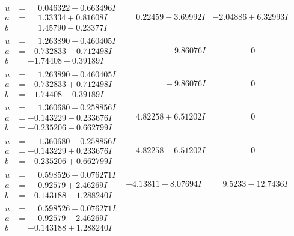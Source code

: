 \documentclass[1p]{elsarticle_modified}
\theoremstyle{definition}
\begin{document}
$$\begin{array}{c|c|c}
\begin{aligned}
u &= \phantom{-}0.046322 - 0.663496 I \\
a &= \phantom{-}1.33334 + 0.81608 I \\
b &= \phantom{-}1.45790 - 0.23377 I\end{aligned}
 & \phantom{-}0.22459 - 3.69992 I & -2.04886 + 6.32993 I \\ \hline\begin{aligned}
u &= \phantom{-}1.263890 + 0.460405 I \\
a &= -0.732833 - 0.712498 I \\
b &= -1.74408 + 0.39189 I\end{aligned}
 & \phantom{-0.000000 -}9.86076 I & \phantom{-0.000000 } 0 \\ \hline\begin{aligned}
u &= \phantom{-}1.263890 - 0.460405 I \\
a &= -0.732833 + 0.712498 I \\
b &= -1.74408 - 0.39189 I\end{aligned}
 & \phantom{-0.000000 } -9.86076 I & \phantom{-0.000000 } 0 \\ \hline\begin{aligned}
u &= \phantom{-}1.360680 + 0.258856 I \\
a &= -0.143229 - 0.233676 I \\
b &= -0.235206 - 0.662799 I\end{aligned}
 & \phantom{-}4.82258 + 6.51202 I & \phantom{-0.000000 } 0 \\ \hline\begin{aligned}
u &= \phantom{-}1.360680 - 0.258856 I \\
a &= -0.143229 + 0.233676 I \\
b &= -0.235206 + 0.662799 I\end{aligned}
 & \phantom{-}4.82258 - 6.51202 I & \phantom{-0.000000 } 0 \\ \hline\begin{aligned}
u &= \phantom{-}0.598526 + 0.076271 I \\
a &= \phantom{-}0.92579 + 2.46269 I \\
b &= -0.143188 - 1.288240 I\end{aligned}
 & -4.13811 + 8.07694 I & \phantom{-}9.5233 - 12.7436 I \\ \hline\begin{aligned}
u &= \phantom{-}0.598526 - 0.076271 I \\
a &= \phantom{-}0.92579 - 2.46269 I \\
b &= -0.143188 + 1.288240 I\end{aligned}

\end{array}$$
\end{document}
